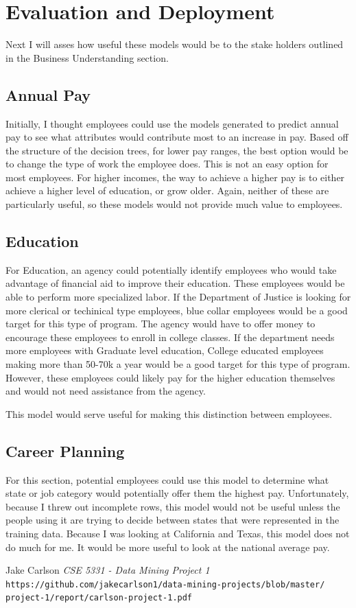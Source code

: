 \documentclass{article}
\begin{document}
\section{Evaluation and Deployment}
Next I will asses how useful these models would be to the stake holders outlined in the Business Understanding section.

    \subsection{Annual Pay}
    Initially, I thought employees could use the models generated to predict annual pay to see what attributes would contribute most to an increase in pay. Based off the structure of the decision trees, for lower pay ranges, the best option would be to change the type of work the employee does. This is not an easy option for most employees. For higher incomes, the way to achieve a higher pay is to either achieve a higher level of education, or grow older. Again, neither of these are particularly useful, so these models would not provide much value to employees.

    \subsection{Education}
    For Education, an agency could potentially identify employees who would take advantage of financial aid to improve their education. These employees would be able to perform more specialized labor. If the Department of Justice is looking for more clerical or techinical type employees, blue collar employees would be a good target for this type of program. The agency would have to offer money to encourage these employees to enroll in college classes. If the department needs more employees with Graduate level education, College educated employees making more than 50-70k a year would be a good target for this type of program. However, these employees could likely pay for the higher education themselves and would not need assistance from the agency.
    \par
    This model would serve useful for making this distinction between employees.

    \subsection{Career Planning}
    For this section, potential employees could use this model to determine what state or job category would potentially offer them the highest pay. Unfortunately, because I threw out incomplete rows, this model would not be useful unless the people using it are trying to decide between states that were represented in the training data. Because I was looking at California and Texas, this model does not do much for me. It would be more useful to look at the national average pay.

\begin{thebibliography}{10}
    Jake Carlson
    \textit{CSE 5331 - Data Mining Project 1}
    \texttt{https://github.com/jakecarlson1/data-mining-projects/blob/master/}
    \texttt{project-1/report/carlson-project-1.pdf}

\end{thebibliography}
\end{document}

